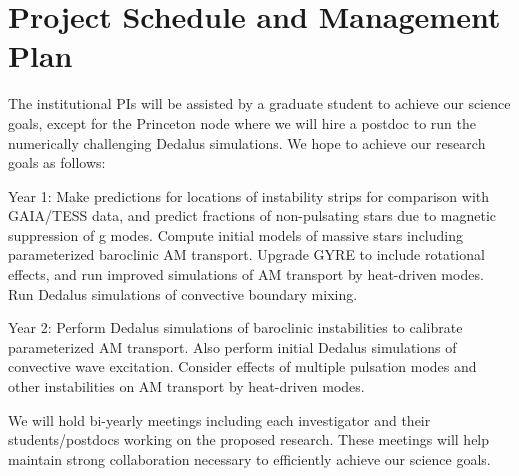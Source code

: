 \section{Project Schedule and Management Plan}

The institutional PIs will be assisted by a graduate student to achieve our science goals, except for the Princeton node where we will hire a postdoc to run the numerically challenging Dedalus simulations. We hope to achieve our research goals as follows:

Year 1: Make predictions for locations of instability strips for comparison with GAIA/TESS data, and predict fractions of non-pulsating stars due to magnetic suppression of g modes. Compute initial models of massive stars including parameterized baroclinic AM transport. Upgrade GYRE to include rotational effects, and run improved simulations of AM transport by heat-driven modes. Run Dedalus simulations of convective boundary mixing.

Year 2: Perform Dedalus simulations of baroclinic instabilities to calibrate parameterized AM transport. Also perform initial Dedalus simulations of convective wave excitation. Consider effects of multiple pulsation modes and other instabilities on AM transport by heat-driven modes. 

We will  hold bi-yearly meetings including each investigator and their students/postdocs working on the proposed research. These meetings will help maintain strong collaboration necessary to efficiently achieve our science goals.
